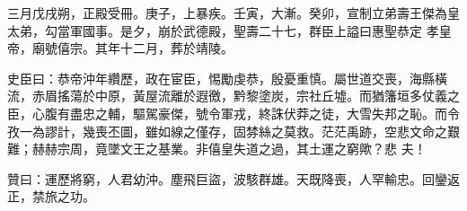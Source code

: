\begin{pinyinscope}
 三月戊戌朔，正殿受冊。庚子，上暴疾。壬寅，大漸。癸卯，宣制立弟壽王傑為皇太弟，勾當軍國事。是夕，崩於武德殿，聖壽二十七，群臣上謚曰惠聖恭定
 孝皇帝，廟號僖宗。其年十二月，葬於靖陵。



 史臣曰：恭帝沖年纘歷，政在宦臣，惕勵虔恭，殷憂重慎。屬世道交喪，海縣橫流，赤眉搖蕩於中原，黃屋流離於遐徼，黔黎塗炭，宗社丘墟。而猶籓垣多仗義之臣，心腹有盡忠之輔，驅駕豪傑，號令軍戎，終誅伏莽之徒，大雪失邦之恥。而令孜一為謬計，幾喪丕圖，雖如線之僅存，固棼絲之莫救。茫茫禹跡，空悲文命之艱難；赫赫宗周，竟墜文王之基業。非僖皇失道之過，其土運之窮歟？悲
 夫！



 贊曰：運歷將窮，人君幼沖。塵飛巨盜，波駭群雄。天既降喪，人罕輸忠。回鑾返正，禁旅之功。



\end{pinyinscope}